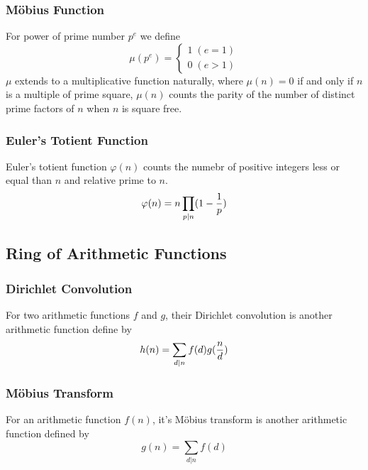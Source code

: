 \documentclass{article}
\begin{document}
\subsubsection*{M\"obius Function}
For power of prime number $p^e$ we define
\begin{equation*}
\mu(p^e) =
\begin{cases}
  1 \; (e = 1) \\
  0 \; (e > 1)
\end{cases}
\end{equation*}
$\mu$ extends to a multiplicative function naturally, where $\mu(n) = 0$ if and only if $n$
is a multiple of prime square, $\mu(n)$ counts the parity of the number of distinct prime
factors of $n$ when $n$ is square free.

\subsubsection*{Euler's Totient Function}
Euler's totient function $\varphi(n)$ counts the numebr of positive integers less or equal than
$n$ and relative prime to $n$.
$$\varphi(n) = n \prod_{p \vert n} (1 - {1 \over p})$$


\subsection{Ring of Arithmetic Functions}
\subsubsection*{Dirichlet Convolution}
For two arithmetic functions $f$ and $g$, their Dirichlet convolution is another arithmetic function
define by $$h(n) = \sum_{d \vert n} f(d) g({n \over d})$$

\subsubsection*{M\"obius Transform}
For an arithmetic function $f(n)$, it's M\"obius transform is another arithmetic function
defined by $$g(n) = \sum_{d \vert n} f(d)$$
\end{document}
